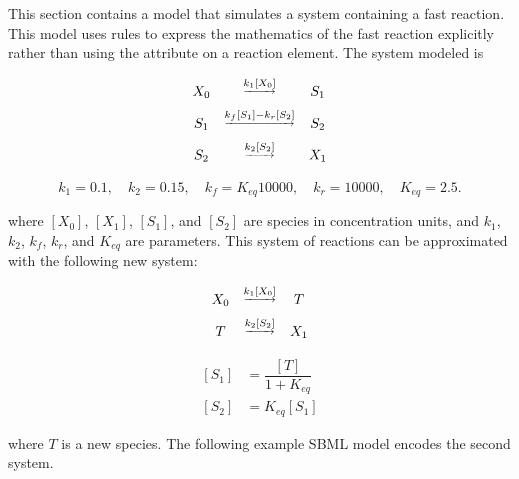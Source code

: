 This section contains a model that simulates a system containing a
fast reaction.  This model uses rules to express the mathematics
of the fast reaction explicitly rather than using the 
attribute on a reaction element.  The system modeled is
\begin{linenomath}
\begin{equation*}
  \begin{array}{@{}ccc@{}}
    X_0 & \overset{\underrightarrow{k_1 [X_0]}}{}           & S_1 \\[6pt]
    S_1 & \overset{\underrightarrow{k_f [S_1] - k_r [S_2]}}{} & S_2 \\[6pt]
    S_2 & \overset{\underrightarrow{k_2 [S_2]}}{}           & X_1 \\[6pt]
  \end{array}
\end{equation*}
\begin{equation*}
    k_1 = 0.1, \quad k_2 = 0.15, \quad k_f = K_{eq} 10000, \quad k_r = 10000, \quad K_{eq} = 2.5.
\end{equation*}
\end{linenomath}
where $[X_0]$, $[X_1]$, $[S_1]$, and $[S_2]$ are species in
concentration units, and $k_1$, $k_2$, $k_f$, $k_r$, and $K_{eq}$
are parameters.  This system of reactions can be approximated with
the following new system:
\begin{linenomath}
  \begin{equation*}
    \begin{array}{@{}ccc@{}}
      X_0 & \overset{\underrightarrow{k_1 [X_0]}}{} & T \\[6pt]
      T & \overset{\underrightarrow{k_2 [S_2]}}{} & X_1
    \end{array}
  \end{equation*}
  \begin{equation*}
    \begin{aligned}\\[-3ex]
      [S_1] & = \dfrac{[T]}{1 + K_{eq}} \\[6pt]
      [S_2] & = K_{eq} [S_1]
    \end{aligned}
  \end{equation*}
\end{linenomath}

where $T$ is a new species.  The following example SBML model
encodes the second system.



